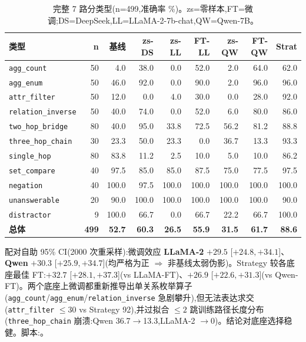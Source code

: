 \documentclass[11pt,a4paper]{article}
\newcommand{\qtype}[1]{\texttt{\small #1}}
\begin{document}
\begin{table}[t]
\centering\small
\caption{完整 7 路分类型(n=499,准确率 \%)。zs=零样本,FT=微调;DS=DeepSeek,LL=LLaMA-2-7b-chat,QW=Qwen-7B。}
\label{tab:rog5way}
\setlength{\tabcolsep}{3.5pt}
\begin{tabular}{l r r r r r r r r}
\toprule
\textbf{类型} & \textbf{n} & \textbf{基线} & \textbf{zs-DS} & \textbf{zs-LL} & \textbf{FT-LL} & \textbf{zs-QW} & \textbf{FT-QW} & \textbf{Strat} \\
\midrule
\qtype{agg\_count}        & 50 & 4.0  & 38.0 & 0.0   & 52.0 & 2.0   & 64.0 & 62.0 \\
\qtype{agg\_enum}         & 50 & 46.0 & 92.0 & 0.0   & 90.0 & 2.0   & 96.0 & 96.0 \\
\qtype{attr\_filter}      & 50 & 12.0 & 0.0  & 4.0   & 30.0 & 0.0   & 28.0 & 92.0 \\
\qtype{relation\_inverse} & 50 & 40.0 & 74.0 & 0.0   & 52.0 & 6.0   & 80.0 & 86.0 \\
\qtype{two\_hop\_bridge}  & 80 & 40.0 & 95.0 & 33.8  & 72.5 & 56.2  & 81.2 & 88.8 \\
\qtype{three\_hop\_chain} & 30 & 23.3 & 50.0 & 23.3  & 0.0  & 36.7  & 13.3 & 93.3 \\
\qtype{single\_hop}       & 80 & 83.8 & 11.2 & 2.5   & 10.0 & 5.0   & 10.0 & 86.2 \\
\qtype{set\_compare}      & 40 & 97.5 & 85.0 & 85.0  & 87.5 & 75.0  & 77.5 & 97.5 \\
\qtype{negation}          & 40 & 100.0& 97.5 & 100.0 & 100.0& 100.0 & 100.0& 100.0 \\
\qtype{unanswerable}      & 20 & 90.0 & 100.0& 100.0 & 100.0& 100.0 & 100.0& 90.0 \\
\qtype{distractor}        & 9  & 100.0& 66.7 & 0.0   & 66.7 & 22.2  & 66.7 & 100.0 \\
\midrule
\textbf{总体} & \textbf{499} & \textbf{52.7} & \textbf{60.3} & \textbf{26.5} & \textbf{55.9} & \textbf{31.5} & \textbf{61.7} & \textbf{88.6} \\
\bottomrule
\end{tabular}
\end{table}

配对自助 95\% CI(2000 次重采样):微调效应 \textbf{LLaMA-2} $+29.5$ [$+24.8, +34.1$]、\textbf{Qwen} $+30.3$ [$+25.9, +34.7$](均严格为正 $\Rightarrow$ 非基线太弱伪影)。Strategy 较各底座最佳 FT:$+32.7$ [$+28.1, +37.3$](vs LLaMA-FT)、$+26.9$ [$+22.6, +31.3$](vs Qwen-FT)。两个底座上微调都重新推导出单关系枚举算子(\qtype{agg\_count}/\qtype{agg\_enum}/\qtype{relation\_inverse} 急剧攀升),但无法表达求交(\qtype{attr\_filter} $\leq$30 vs Strategy 92),并过拟合 ${\leq}2$ 跳训练路径长度分布(\qtype{three\_hop\_chain} 崩溃:Qwen 36.7$\to$13.3,LLaMA-2 $\to$0)。结论对底座选择稳健。脚本:。
\end{document}
